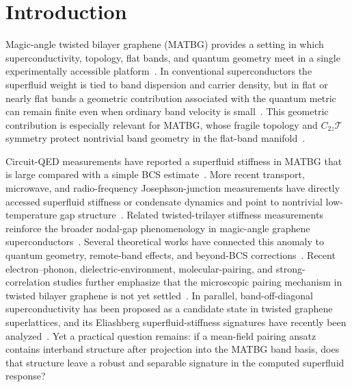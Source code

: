 \documentclass[aps,prb,reprint,superscriptaddress,floatfix,nofootinbib]{revtex4-2}
\begin{document}
\maketitle

\section{Introduction}

Magic-angle twisted bilayer graphene (MATBG) provides a setting in which
superconductivity, topology, flat bands, and quantum geometry meet in a single
experimentally accessible platform~\cite{cao_sc_2018,cao_insulator_2018,yankowitz_2019}.
In conventional superconductors the superfluid weight is tied to band
dispersion and carrier density, but in flat or nearly flat bands a geometric
contribution associated with the quantum metric can remain finite even when
ordinary band velocity is small~\cite{peotta_torma_2015,torma_review_2022}.
This geometric contribution is especially relevant for MATBG, whose fragile
topology and $C_{2z}\mathcal{T}$ symmetry protect nontrivial band geometry in the
flat-band manifold~\cite{song_2019,po_2019,xie_2020_prl}.

Circuit-QED measurements have reported a superfluid stiffness in MATBG that is
large compared with a simple BCS estimate~\cite{tian_2023}.
More recent transport, microwave, and radio-frequency Josephson-junction
measurements have directly accessed superfluid stiffness or condensate
dynamics and point to nontrivial low-temperature gap
structure~\cite{tanaka_2025,portoles_2025}.
Related twisted-trilayer stiffness measurements reinforce the broader nodal-gap
phenomenology in magic-angle graphene superconductors~\cite{banerjee_2025}.
Several theoretical works have connected this anomaly to quantum geometry,
remote-band effects, and beyond-BCS corrections~\cite{hu_2019,julku_2020,verma_2021}.
Recent electron--phonon, dielectric-environment, molecular-pairing, and
strong-correlation studies further emphasize that the microscopic pairing
mechanism in twisted bilayer graphene is not yet
settled~\cite{chen_epc_2024,gao_interactions_2026,wang_molecular_pairing_2024,liang_gutzwiller_2026}.
In parallel, band-off-diagonal superconductivity has been proposed as a
candidate state in twisted graphene superlattices, and its Eliashberg
superfluid-stiffness signatures have recently been analyzed~\cite{christos_2023,putzer_2025}.
Yet a practical question remains: if a mean-field pairing ansatz contains
interband structure after projection into the MATBG band basis, does that
structure leave a robust and separable signature in the computed superfluid
response?
\end{document}
